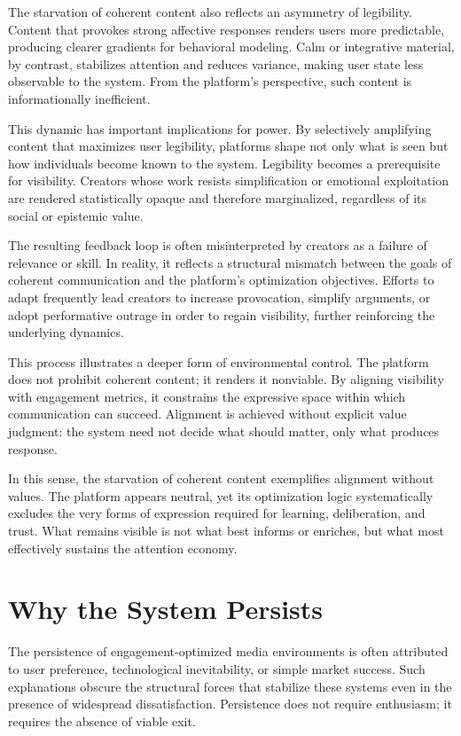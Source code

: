 \documentclass[12pt]{article}
\begin{document}
The starvation of coherent content also reflects an asymmetry of legibility. Content that provokes strong affective responses renders users more predictable, producing clearer gradients for behavioral modeling. Calm or integrative material, by contrast, stabilizes attention and reduces variance, making user state less observable to the system. From the platform’s perspective, such content is informationally inefficient.

This dynamic has important implications for power. By selectively amplifying content that maximizes user legibility, platforms shape not only what is seen but how individuals become known to the system. Legibility becomes a prerequisite for visibility. Creators whose work resists simplification or emotional exploitation are rendered statistically opaque and therefore marginalized, regardless of its social or epistemic value.

The resulting feedback loop is often misinterpreted by creators as a failure of relevance or skill. In reality, it reflects a structural mismatch between the goals of coherent communication and the platform’s optimization objectives. Efforts to adapt frequently lead creators to increase provocation, simplify arguments, or adopt performative outrage in order to regain visibility, further reinforcing the underlying dynamics.

This process illustrates a deeper form of environmental control. The platform does not prohibit coherent content; it renders it nonviable. By aligning visibility with engagement metrics, it constrains the expressive space within which communication can succeed. Alignment is achieved without explicit value judgment: the system need not decide what should matter, only what produces response.

In this sense, the starvation of coherent content exemplifies alignment without values. The platform appears neutral, yet its optimization logic systematically excludes the very forms of expression required for learning, deliberation, and trust. What remains visible is not what best informs or enriches, but what most effectively sustains the attention economy.

\section{Why the System Persists}

The persistence of engagement-optimized media environments is often attributed to user preference, technological inevitability, or simple market success. Such explanations obscure the structural forces that stabilize these systems even in the presence of widespread dissatisfaction. Persistence does not require enthusiasm; it requires the absence of viable exit.
\end{document}
